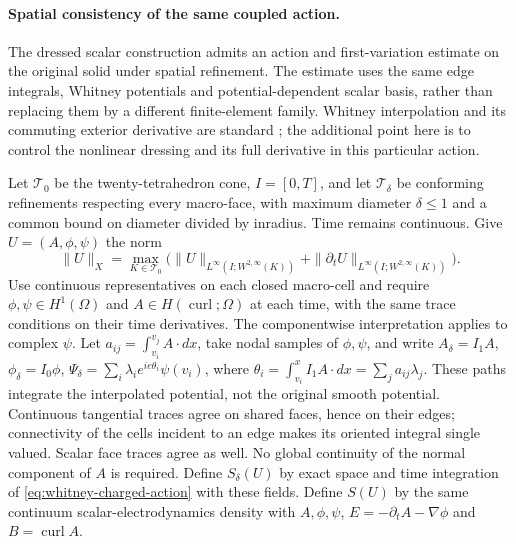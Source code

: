 \paragraph{Spatial consistency of the same coupled action.}
The dressed scalar construction admits an action and first-variation
estimate on the original solid under spatial refinement. The estimate uses
the same edge integrals, Whitney potentials and potential-dependent scalar
basis, rather than replacing them by a different finite-element family.
Whitney interpolation and its commuting exterior derivative are standard
\cite{ArnoldFalkWinther2010}; the additional point here is to control the
nonlinear dressing and its full derivative in this particular action.

Let \(\mathcal T_0\) be the twenty-tetrahedron cone, \(I=[0,T]\),
and let \(\mathcal T_\delta\) be conforming refinements respecting every
macro-face, with maximum diameter \(\delta\leq1\) and a common bound
on diameter divided by inradius. Time remains continuous. Give
\(U=(A,\phi,\psi)\) the norm
\[
 \|U\|_X=\max_{K\in\mathcal T_0}
 \bigl(\|U\|_{L^\infty(I;W^{2,\infty}(K))}
       +\|\partial_tU\|_{L^\infty(I;W^{2,\infty}(K))}\bigr).
\]
Use continuous representatives on each closed macro-cell and require
\(\phi,\psi\in H^1(\Omega)\) and \(A\in H(\operatorname{curl};\Omega)\)
at each time, with the same trace conditions on their time derivatives.
The componentwise interpretation applies to complex \(\psi\).
Let \(a_{ij}=\int_{v_i}^{v_j} A\cdot dx\), take nodal samples of
\(\phi,\psi\), and write \(A_\delta=I_1A\),
\(\phi_\delta=I_0\phi\),
\(\Psi_\delta=\sum_i\lambda_i e^{ie\theta_i}\psi(v_i)\), where
\(\theta_i=\int_{v_i}^{x} I_1A\cdot dx=\sum_j a_{ij}\lambda_j\).
These paths integrate the interpolated potential, not the original smooth
potential. Continuous tangential traces agree on shared faces, hence on
their edges; connectivity of the cells incident to an edge makes its
oriented integral single valued. Scalar face traces agree as well.
No global continuity of the normal component of \(A\) is required.
Define \(S_\delta(U)\) by exact space and time integration
of \eqref{eq:whitney-charged-action} with these fields. Define \(S(U)\)
by the same continuum scalar-electrodynamics density with \(A,\phi,\psi\),
\(E=-\partial_tA-\nabla\phi\) and \(B=\operatorname{curl}A\).

